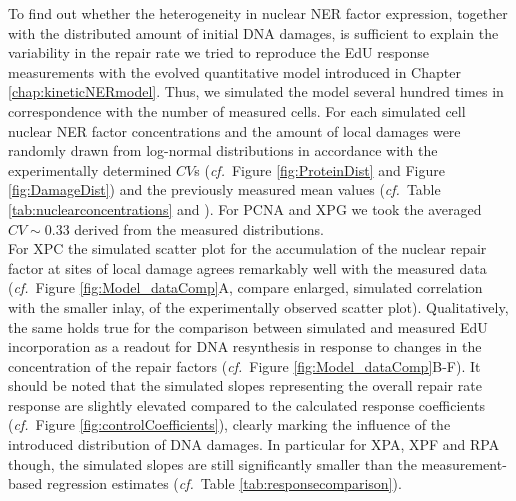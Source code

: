 To find out whether the heterogeneity in nuclear NER factor expression, together with the distributed amount of initial DNA damages, is sufficient to explain the variability in the repair rate we tried to reproduce the EdU response measurements with the evolved quantitative model introduced in Chapter \ref{chap:kineticNERmodel}. Thus, we simulated the model several hundred times in correspondence with the number of measured cells. For each simulated cell nuclear NER factor concentrations and the amount of local damages were randomly drawn from log-normal distributions in accordance with the experimentally determined $CV$s (\textit{cf.}\ Figure \ref{fig:ProteinDist} and Figure \ref{fig:DamageDist}) and the previously measured mean values (\textit{cf.}\ Table \ref{tab:nuclearconcentrations} and \cite{Luijsterburg2010}). For PCNA and XPG we took the averaged $CV\sim$0.33 derived from the measured distributions. \\
For XPC the simulated scatter plot for the accumulation of the nuclear repair factor at sites of local damage agrees remarkably well with the measured data (\textit{cf.}\ Figure \ref{fig:Model_dataComp}A, compare enlarged, simulated correlation with the smaller inlay, of the experimentally observed scatter plot). Qualitatively, the same holds true for the comparison between simulated and measured EdU incorporation as a readout for DNA resynthesis in response to changes in the concentration of the repair factors (\textit{cf.}\ Figure \ref{fig:Model_dataComp}B-F). It should be noted that the simulated slopes representing the overall repair rate response are slightly elevated compared to the calculated response coefficients (\textit{cf.}\ Figure \ref{fig:controlCoefficients}), clearly marking the influence of the introduced distribution of DNA damages. In particular for XPA, XPF and RPA though, the simulated slopes are still significantly smaller than the measurement-based regression estimates (\textit{cf.}\ Table \ref{tab:responsecomparison}). 
